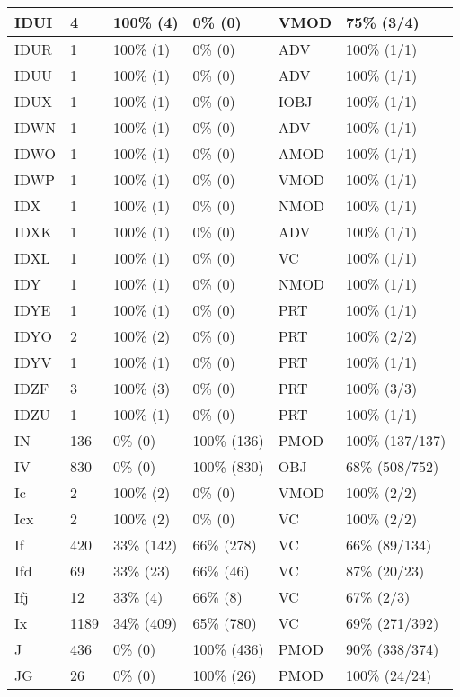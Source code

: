 \begin{figure*}
\begin{tabular}{|l|l|l|l||l|l|}
\hline
 IDUI & 4 & 100\% (4) & 0\% (0) & VMOD & 75\% (3/4) \\ 
\hline
 IDUR & 1 & 100\% (1) & 0\% (0) & ADV & 100\% (1/1) \\ 
\hline
 IDUU & 1 & 100\% (1) & 0\% (0) & ADV & 100\% (1/1) \\ 
\hline
 IDUX & 1 & 100\% (1) & 0\% (0) & IOBJ & 100\% (1/1) \\ 
\hline
 IDWN & 1 & 100\% (1) & 0\% (0) & ADV & 100\% (1/1) \\ 
\hline
 IDWO & 1 & 100\% (1) & 0\% (0) & AMOD & 100\% (1/1) \\ 
\hline
 IDWP & 1 & 100\% (1) & 0\% (0) & VMOD & 100\% (1/1) \\ 
\hline
 IDX & 1 & 100\% (1) & 0\% (0) & NMOD & 100\% (1/1) \\ 
\hline
 IDXK & 1 & 100\% (1) & 0\% (0) & ADV & 100\% (1/1) \\ 
\hline
 IDXL & 1 & 100\% (1) & 0\% (0) & VC & 100\% (1/1) \\ 
\hline
 IDY & 1 & 100\% (1) & 0\% (0) & NMOD & 100\% (1/1) \\ 
\hline
 IDYE & 1 & 100\% (1) & 0\% (0) & PRT & 100\% (1/1) \\ 
\hline
 IDYO & 2 & 100\% (2) & 0\% (0) & PRT & 100\% (2/2) \\ 
\hline
 IDYV & 1 & 100\% (1) & 0\% (0) & PRT & 100\% (1/1) \\ 
\hline
 IDZF & 3 & 100\% (3) & 0\% (0) & PRT & 100\% (3/3) \\ 
\hline
 IDZU & 1 & 100\% (1) & 0\% (0) & PRT & 100\% (1/1) \\ 
\hline
 IN & 136 & 0\% (0) & 100\% (136) & PMOD & 100\% (137/137) \\ 
\hline
 IV & 830 & 0\% (0) & 100\% (830) & OBJ & 68\% (508/752) \\ 
\hline
 Ic & 2 & 100\% (2) & 0\% (0) & VMOD & 100\% (2/2) \\ 
\hline
 Icx & 2 & 100\% (2) & 0\% (0) & VC & 100\% (2/2) \\ 
\hline
 If & 420 & 33\% (142) & 66\% (278) & VC & 66\% (89/134) \\ 
\hline
 Ifd & 69 & 33\% (23) & 66\% (46) & VC & 87\% (20/23) \\ 
\hline
 Ifj & 12 & 33\% (4) & 66\% (8) & VC & 67\% (2/3) \\ 
\hline
 Ix & 1189 & 34\% (409) & 65\% (780) & VC & 69\% (271/392) \\ 
\hline
 J & 436 & 0\% (0) & 100\% (436) & PMOD & 90\% (338/374) \\ 
\hline
 JG & 26 & 0\% (0) & 100\% (26) & PMOD & 100\% (24/24) \\ 
\hline
\end{tabular}
\end{figure*}
